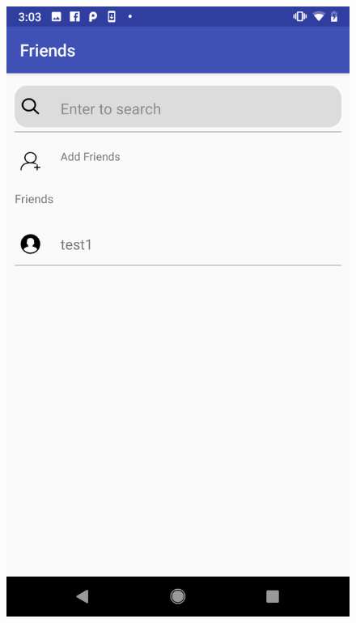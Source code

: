 \begin{figure}[H]
\centering
\begin{minipage}[t]{0.4\textwidth}
\includegraphics[width=.95\textwidth]{section03/assets/FriendsList.png}
\subcaption{\label{FriendsListUI}}
\end{minipage}%
\begin{minipage}[t]{0.4\textwidth}

\end{minipage}
\end{figure}
